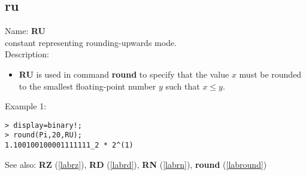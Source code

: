 \subsection{ru}
\label{labru}
\noindent Name: \textbf{RU}\\
constant representing rounding-upwards mode.\\
\noindent Description: \begin{itemize}

\item \textbf{RU} is used in command \textbf{round} to specify that the value $x$ must be rounded
   to the smallest floating-point number $y$ such that $x \le y$.
\end{itemize}
\noindent Example 1: 
\begin{center}\begin{minipage}{15cm}\begin{Verbatim}[frame=single]
> display=binary!;
> round(Pi,20,RU);
1.100100100001111111_2 * 2^(1)
\end{Verbatim}
\end{minipage}\end{center}
See also: \textbf{RZ} (\ref{labrz}), \textbf{RD} (\ref{labrd}), \textbf{RN} (\ref{labrn}), \textbf{round} (\ref{labround})
